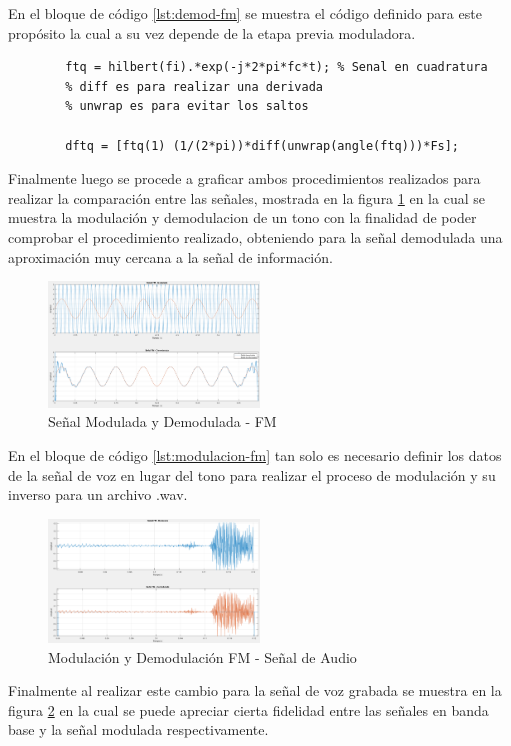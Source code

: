 \documentclass[conference]{IEEEtran}
\begin{document}
	En el bloque de código \ref{lst:demod-fm} se muestra el código definido para este propósito la cual a su vez depende de la etapa previa moduladora.
	
	\begin{lstlisting}[numbers=none, caption="Demodulación FM", label=lst:demod-fm]
		%% Demodulacion FM
		ftq = hilbert(fi).*exp(-j*2*pi*fc*t); % Senal en cuadratura
		% diff es para realizar una derivada
		% unwrap es para evitar los saltos
		
		dftq = [ftq(1) (1/(2*pi))*diff(unwrap(angle(ftq)))*Fs];
	\end{lstlisting}
	
	Finalmente luego se procede a graficar ambos procedimientos realizados para realizar la comparación entre las señales, mostrada en la figura \ref{fig:mod-demod-fm-audio} en la cual se muestra la modulación y demodulacion de un tono con la finalidad de poder comprobar el procedimiento realizado, obteniendo para la señal demodulada una aproximación muy cercana a la señal de información.
	
	\begin{figure}[h]
		\centering
		\includegraphics[width=0.5\textwidth]{media/mod-demod-fm-audio}
		\caption{Señal Modulada y Demodulada - FM}
		\label{fig:mod-demod-fm-audio}
	\end{figure}
	
	En el bloque de código \ref{lst:modulacion-fm} tan solo es necesario definir los datos de la señal de voz en lugar del tono para realizar el proceso de modulación y su inverso para un archivo .wav.
	
	\begin{figure}[h]
		\centering
		\includegraphics[width=0.5\textwidth]{media/mod-dmod-audio}
		\caption{Modulación y Demodulación FM - Señal de Audio}
		\label{fig:mod-dmod-audio}
	\end{figure}
	
	Finalmente al realizar este cambio para la señal de voz grabada se muestra en la figura \ref{fig:mod-dmod-audio} en la cual se puede apreciar cierta fidelidad entre las señales en banda base y la señal modulada respectivamente.
	
	
	
\end{document}
